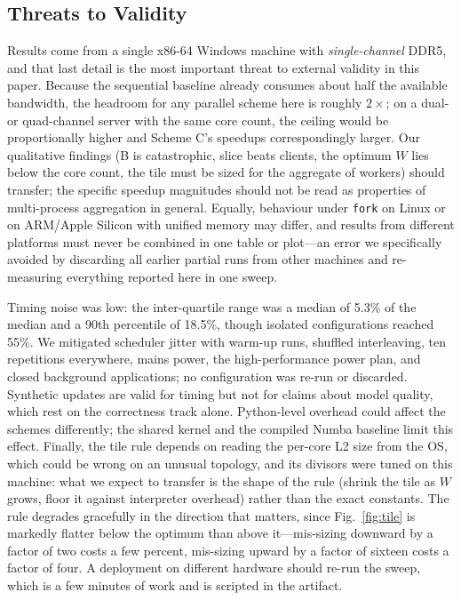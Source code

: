 \documentclass[conference]{IEEEtran}
\begin{document}
\subsection{Threats to Validity}
\label{sec:threats}
Results come from a single x86-64 Windows machine with \emph{single-channel} DDR5, and that last detail is the most important threat to external validity in this paper. Because the sequential baseline already consumes about half the available bandwidth, the headroom for any parallel scheme here is roughly $2\times$; on a dual- or quad-channel server with the same core count, the ceiling would be proportionally higher and Scheme C's speedups correspondingly larger. Our qualitative findings (B is catastrophic, slice beats clients, the optimum $W$ lies below the core count, the tile must be sized for the aggregate of workers) should transfer; the specific speedup magnitudes should not be read as properties of multi-process aggregation in general. Equally, behaviour under \texttt{fork} on Linux or on ARM/Apple Silicon with unified memory may differ, and results from different platforms must never be combined in one table or plot---an error we specifically avoided by discarding all earlier partial runs from other machines and re-measuring everything reported here in one sweep.

Timing noise was low: the inter-quartile range was a median of 5.3\% of the median and a 90th percentile of 18.5\%, though isolated configurations reached 55\%. We mitigated scheduler jitter with warm-up runs, shuffled interleaving, ten repetitions everywhere, mains power, the high-performance power plan, and closed background applications; no configuration was re-run or discarded. Synthetic updates are valid for timing but not for claims about model quality, which rest on the correctness track alone. Python-level overhead could affect the schemes differently; the shared kernel and the compiled Numba baseline limit this effect. Finally, the tile rule depends on reading the per-core L2 size from the OS, which could be wrong on an unusual topology, and its divisors were tuned on this machine: what we expect to transfer is the shape of the rule (shrink the tile as $W$ grows, floor it against interpreter overhead) rather than the exact constants. The rule degrades gracefully in the direction that matters, since Fig.~\ref{fig:tile} is markedly flatter below the optimum than above it---mis-sizing downward by a factor of two costs a few percent, mis-sizing upward by a factor of sixteen costs a factor of four. A deployment on different hardware should re-run the sweep, which is a few minutes of work and is scripted in the artifact.
\end{document}

